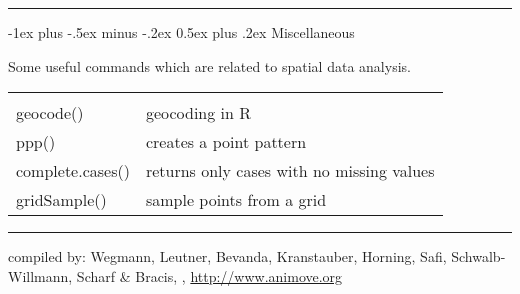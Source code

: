 \documentclass[a4paper,10pt,landscape]{article}
\makeatletter
\renewcommand{\section}{\@startsection{section}{1}{0mm}%
                                {-1ex plus -.5ex minus -.2ex}%
                                {0.5ex plus .2ex}%
                                {\normalfont\large\bfseries}}
\makeatother
\begin{document}
\begin{multicols}{3}
\begin{tabular}{@{}p{\the\MyLen + 20pt}%
                @{}p{\linewidth-\the\MyLen - 20pt}@{}}
\end{tabular}

\rule{0.32\textwidth}{0.4pt}
\section{Miscellaneous}

Some useful commands which are related to spatial data analysis.


\begin{tabular}{@{}p{\the\MyLen}%
                @{}p{\linewidth-\the\MyLen}@{}}
                & \\
geocode() & geocoding in R \\
ppp() & creates a point pattern \\

complete.cases() &  returns only cases with no missing values \\                
gridSample() & sample points from a grid \\

\end{tabular}




\scriptsize
\quad
\rule{0.32\textwidth}{0.4pt}

compiled by: Wegmann, Leutner, Bevanda, Kranstauber, Horning, Safi, Schwalb-Willmann, Scharf  \& Bracis, \THEYEAR, \url{http://www.animove.org}









\end{multicols}
\end{document}
